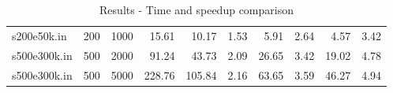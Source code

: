 \documentclass[11pt,english]{article}
\begin{document}
\begin{table}[h]
\begin{tabular}{lrrrlrrrrrr}
\multicolumn{1}{l|}{s200e50k.in} & \multicolumn{1}{r|}{200} & \multicolumn{1}{r|}{1000} & \multicolumn{2}{r|}{15.61} & 10.17 & \multicolumn{1}{r|}{1.53} & 5.91 & \multicolumn{1}{r|}{2.64} & 4.57 & 3.42 \\ 

\multicolumn{1}{l|}{s500e300k.in} & \multicolumn{1}{r|}{500} & \multicolumn{1}{r|}{2000} & \multicolumn{2}{r|}{91.24} & 43.73 & \multicolumn{1}{r|}{2.09} & 26.65 & \multicolumn{1}{r|}{3.42} & 19.02 & 4.78 \\ 

\multicolumn{1}{l|}{s500e300k.in} & \multicolumn{1}{r|}{500} & \multicolumn{1}{r|}{5000} & \multicolumn{2}{r|}{228.76} & 105.84 & \multicolumn{1}{r|}{2.16} & 63.65 & \multicolumn{1}{r|}{3.59} & 46.27 & 4.94 \\ 
\hline
\end{tabular}
\caption{Results - Time and speedup comparison}
\label{table:results}
\end{table}
\end{document}
